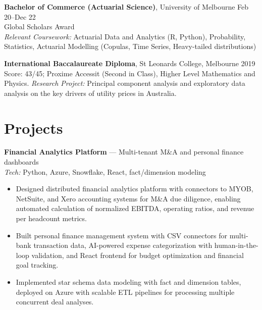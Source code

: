 \documentclass[10pt,letterpaper]{article}
\begin{document}
\textbf{Bachelor of Commerce (Actuarial Science)}, University of Melbourne \hfill Feb 20--Dec 22\\
Global Scholars Award\\
\emph{Relevant Coursework:} Actuarial Data and Analytics (R, Python), Probability, Statistics, Actuarial Modelling (Copulas, Time Series, Heavy-tailed distributions)

\textbf{International Baccalaureate Diploma}, St Leonards College, Melbourne \hfill 2019\\
Score: 43/45; Proxime Accessit (Second in Class), Higher Level Mathematics and Physics.
\emph{Research Project:} Principal component analysis and exploratory data analysis on the key drivers of utility prices in Australia.

\section*{Projects}

\begin{samepage}
\textbf{Financial Analytics Platform} — Multi-tenant M\&A and personal finance dashboards \hfill \\
\emph{Tech:} Python, Azure, Snowflake, React, fact/dimension modeling\\[-1.1em]
\begin{itemize}
  \item Designed distributed financial analytics platform with connectors to MYOB, NetSuite, and Xero accounting systems for M\&A due diligence, enabling automated calculation of normalized EBITDA, operating ratios, and revenue per headcount metrics.
  \item Built personal finance management system with CSV connectors for multi-bank transaction data, AI-powered expense categorization with human-in-the-loop validation, and React frontend for budget optimization and financial goal tracking.
  \item Implemented star schema data modeling with fact and dimension tables, deployed on Azure with scalable ETL pipelines for processing multiple concurrent deal analyses.
\end{itemize}
\end{samepage}
\end{document}
